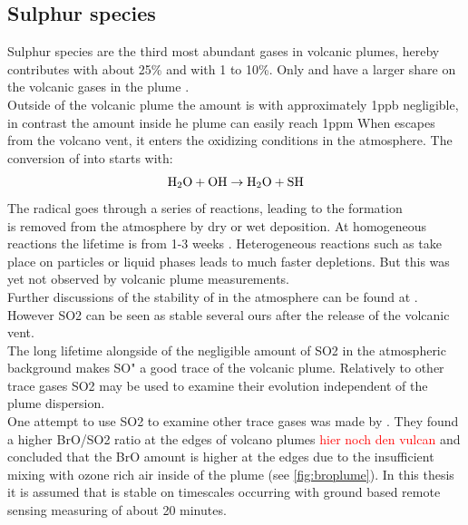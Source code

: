 \documentclass  [
  paper    = a4,
  BCOR     = 10mm,
  twoside,
  fontsize = 12pt,
  fleqn,
  toc      = bibnumbered,
  toc      = listofnumbered,
  numbers  = noendperiod,
  headings = normal,
  listof   = leveldown,
  version  = 3.03
]                                       {scrreprt}
\begin{document}
\subsection{Sulphur species\label{chap:so2}}
Sulphur species are the third most abundant gases in volcanic plumes, hereby contributes   with about 25\% and  with 1 to 10\%. Only  and  have a larger share on the volcanic gases in the plume .\\
Outside of the volcanic plume the   amount is with approximately 1ppb negligible, in contrast the   amount inside he plume can easily reach 1ppm \cite{Coppenheimer 2003}
When  escapes from the volcano vent, it enters the oxidizing conditions in the atmosphere. The conversion of  into  starts with:
\begin{equation*}
\ce{H2O}+\ce{OH}\rightarrow \ce{H2O}+\ce{SH}
\end{equation*}
The  radical goes through a series of reactions, leading to the  formation \cite{Seinfeld}\\
 is removed from the atmosphere by dry or wet
deposition. At homogeneous reactions the lifetime is from 1-3 weeks \cite{robock2000volcanic}. Heterogeneous reactions such as take place on particles or liquid phases leads to much faster depletions. But this was yet not observed by volcanic plume measurements.\\
Further discussions of the stability of   in the atmosphere can be found at \cite{lubcke2014optical}.\\
However SO2 can be seen as stable several ours after the release of the volcanic vent.\\ The long lifetime  alongside of the negligible amount of SO2 in the atmospheric background makes SO" a good trace of the volcanic plume.
Relatively to other trace gases SO2 may be used to examine their evolution independent of the plume dispersion.\\
One attempt to use SO2 to examine other trace gases was made by \cite{bobrowski2007reactive}. They found a higher BrO/SO2 ratio at the edges of volcano plumes \textcolor{red}{hier noch den vulcan} and concluded that the BrO amount is higher at the edges due to the insufficient mixing with ozone rich air inside of the plume (see \ref{fig:broplume}).
In this thesis it is assumed that   is stable on timescales occurring with ground based remote sensing measuring of about 20 minutes. \\
\end{document}
